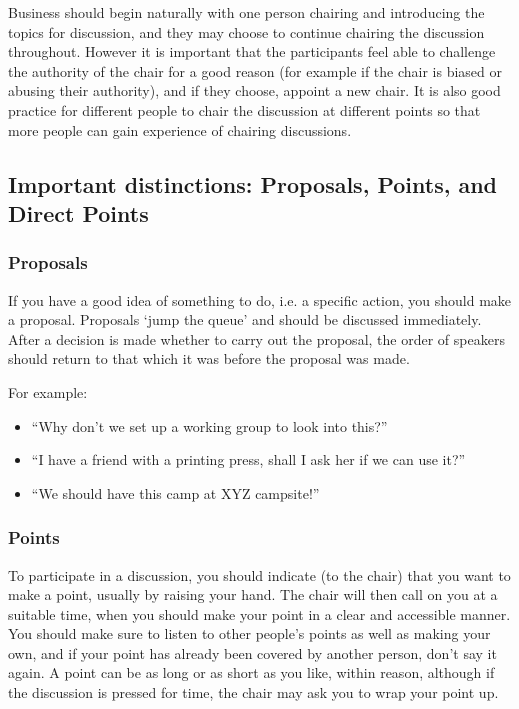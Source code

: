\documentclass[a4paper, 12pt]{article} %
\begin{document}
Business should begin naturally with one person chairing and introducing the topics for discussion, and they may choose to continue chairing the discussion throughout.  However it is important that the participants feel able to challenge the authority of the chair for a good reason (for example if the chair is biased or abusing their authority), and if they choose, appoint a new chair.  It is also good practice for different people to chair the discussion at different points so that more people can gain experience of chairing discussions.

\subsection{Important distinctions: Proposals, Points, and Direct Points}
\subsubsection{Proposals}
If you have a good idea of something to do, i.e. a specific action, you should make a proposal.  Proposals `jump the queue' and should be discussed immediately.  After a decision is made whether to carry out the proposal, the order of speakers should return to that which it was before the proposal was made.

For example:
\begin{itemize}
\item ``Why don't we set up a working group to look into this?''
\item ``I have a friend with a printing press, shall I ask her if we can use it?''
\item ``We should have this camp at XYZ campsite!''
\end{itemize}

\subsubsection{Points}
To participate in a discussion, you should indicate (to the chair) that you want to make a point, usually by raising your hand.  The chair will then call on you at a suitable time, when you should make your point in a clear and accessible manner.  You should make sure to listen to other people's points as well as making your own, and if your point has already been covered by another person, don't say it again.  A point can be as long or as short as you like, within reason, although if the discussion is pressed for time, the chair may ask you to wrap your point up.
\end{document}
